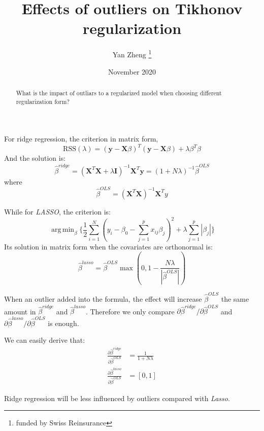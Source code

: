 \documentclass[12pt, letterpaper]{article}
\title{Effects of outliers on Tikhonov regularization}
\author{Yan Zheng \thanks{funded by Swiss Reinsurance}}
\date{November 2020}
\DeclareMathOperator*{\argmin}{arg\,min}
\begin{document}
\maketitle

\begin{abstract}
What is the impact of outliars to a regularized model when choosing different regularization form?
\end{abstract}

For ridge regression, the criterion in matrix form,
\begin{equation}
\text{RSS} (\lambda)  = (\textbf{y} - \textbf{X} \beta)^{T}(\textbf{y}-\textbf{X} \beta) + \lambda \beta^{T} \beta
\end{equation}
And the solution is:
\begin{equation}
{\hat{\beta}}^{ridge} = (\textbf{X}^T \textbf{X} + \lambda \textbf{I})^{-1} \textbf{X}^T \textbf{y} = (1 + N \lambda)^{-1} {\hat{\beta}}^{OLS}
\end{equation}
where
\begin{equation}
{\hat{\beta}}^{OLS}=(\textbf{X}^T \textbf{X})^{-1} \textbf{X}^T y
\end{equation}

While for \emph{LASSO}, the criterion is:
\begin{equation}
\argmin_{\beta} \lbrace \frac{1}{2} \sum^{N}_{i=1} (y_i - \beta_0 - \sum^p_{j=1} x_{ij} \beta_j)^2 + \lambda \sum^p_{j=1} |\beta_j| \rbrace
\end{equation}
Its solution in matrix form when the covariates are orthonormal is:
\begin{equation}
{\hat{\beta}}^{lasso} = {\hat{\beta}}^{OLS} \max (0, 1 - \frac{N \lambda}{|{\hat{\beta}}^{OLS}|})
\end{equation}

When an outlier added into the formula, the effect will increase ${\hat{\beta}}^{OLS}$ the same amount in ${\hat{\beta}}^{ridge}$
and ${\hat{\beta}}^{lasso}$.
Therefore we only compare $\partial{{\hat{\beta}}^{ridge}} / \partial{{\hat{\beta}}^{OLS}}$ and
$\partial{{\hat{\beta}}^{lasso}} / \partial{{\hat{\beta}}^{OLS}}$ is enough.

We can easily derive that:
\begin{equation}
\begin{aligned}
\frac{\partial{{\hat{\beta}}^{ridge}}}{\partial{{\hat{\beta}}^{OLS}}} &= \frac{1}{1 + N \lambda} \\
\frac{\partial{{\hat{\beta}}^{lasso}}}{\partial{{\hat{\beta}}^{OLS}}} &= [0, 1]
\end{aligned}
\end{equation}

Ridge regression will be less influenced by outliers compared with \emph{Lasso}.
\end{document}
